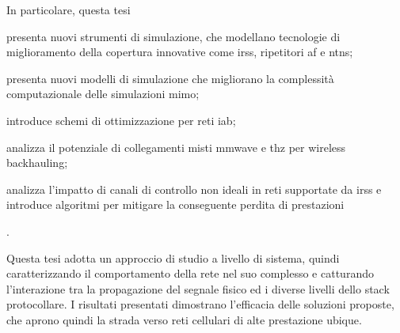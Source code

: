 In particolare, questa tesi
\begin{enumerate*}[label=(\roman*)]
\item presenta nuovi strumenti di simulazione, che modellano tecnologie di miglioramento della copertura innovative come \glspl{irs}, ripetitori \gls{af} e \glspl{ntn};
\item presenta nuovi modelli di simulazione che migliorano la complessità computazionale delle simulazioni \gls{mimo};
\item introduce schemi di ottimizzazione per reti \gls{iab};
\item analizza il potenziale di collegamenti misti \gls{mmwave} e \gls{thz} per wireless backhauling;
\item analizza l'impatto di canali di controllo non ideali in reti supportate da \glspl{irs} e introduce algoritmi per mitigare la conseguente perdita di prestazioni
\end{enumerate*}.

Questa tesi adotta un approccio di studio a livello di sistema, quindi caratterizzando il comportamento della rete nel suo complesso e catturando l'interazione tra la propagazione del segnale fisico ed i diverse livelli dello stack protocollare. I risultati presentati dimostrano l'efficacia delle soluzioni proposte, che aprono quindi la strada verso reti cellulari di alte prestazione ubique.